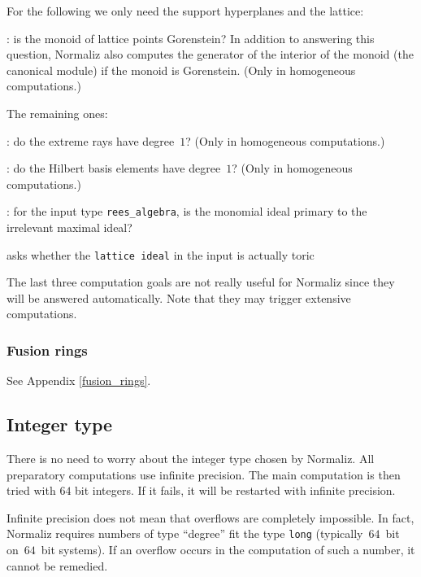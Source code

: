 For the following we only need the support hyperplanes and the lattice:

\begin{itemize}
	\itemtt[IsGorenstein, -G]: is the monoid of lattice points Gorenstein? In addition to answering this question, Normaliz also computes the generator of the interior of the monoid (the canonical module) if the monoid is Gorenstein. (Only in homogeneous computations.)
\end{itemize}

The remaining ones:

\begin{itemize}
	
	: do the extreme rays have degree~$1$? (Only in homogeneous computations.)
	
	: do the Hilbert basis elements have degree~$1$? (Only in homogeneous computations.)
	
	\itemtt[IsReesPrimary]: for the input type \verb|rees_algebra|, is the monomial ideal primary to the irrelevant maximal ideal?
	
	\itemtt[IsLatticeIdealToric] asks whether the \verb|lattice ideal| in the input is actually toric 
	
\end{itemize}

The last three computation goals are not really useful for Normaliz since they will be answered automatically. Note that they may trigger extensive computations.

\subsubsection{Fusion rings}

See Appendix \ref{fusion_rings}.

\subsection{Integer type}\label{Integer}

There is no need to worry about the integer type chosen by Normaliz. All preparatory computations use infinite precision. The main computation is then tried with $64$ bit integers. If it fails, it will be restarted with infinite precision.

Infinite precision does not mean that overflows are completely impossible. In fact, Normaliz requires numbers of type ``degree'' fit the type \verb|long| (typically~$64$~bit on~$64$~bit systems). If an overflow occurs in the computation of such a number, it cannot be remedied.

